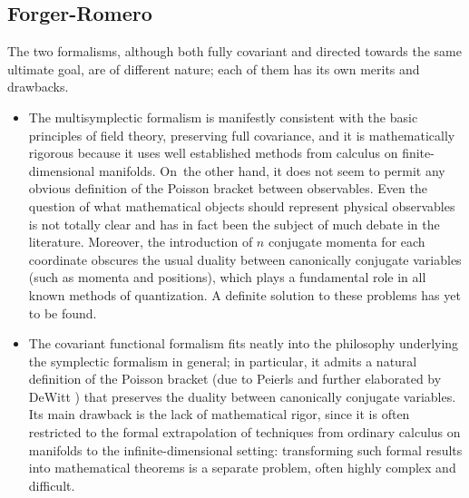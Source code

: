 \documentclass[a4paper,12pt,fleqn]{article}  %
\begin{document}
\subsection{Forger-Romero}
The two formalisms, although both fully covariant and directed towards
the same ulti\-mate goal, are of different nature; each of them has its
own merits and drawbacks.
\begin{itemize}
 \item The multisymplectic formalism is manifestly consistent with the
       basic principles of field theory, preserving full covariance, and
       it is mathematically rigorous because it uses well established
       methods from calculus on finite-dimensional manifolds. On~the
       other hand, it does not seem to permit any obvious definition
       of the \mbox{Poisson} bracket between observables. Even the
       question of what mathematical objects should represent physical
       observables is not totally clear and has in fact been the subject
       of much debate in the literature. Moreover, the introduction of
       $n$ conjugate momenta for each coordinate obscures the usual
       duality between canonically conjugate variables (such as momenta
       and positions), which plays a fundamental role in all known methods
       of quantization. A definite solution to these problems has yet to be
       found.
 \item The covariant functional formalism fits neatly into the philosophy
       underlying the symplectic formalism in general; in particular, it
       admits a natural definition of the Poisson bracket (due to Peierls
       \cite{Pe} and further elaborated by DeWitt \cite{DW1,DW2,DW3})
       \linebreak that preserves the duality between canonically conjugate
       variables. Its main drawback is the lack of mathematical rigor, since
       it is often restricted to the formal extrapolation of techniques from
       ordinary calculus on manifolds to the infinite-dimensional setting:
       transforming such formal results into mathematical theorems is a
       separate problem, often highly complex and difficult.
\end{itemize}
\end{document}
